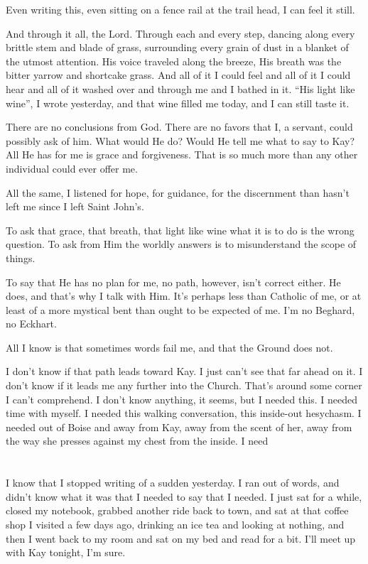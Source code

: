Even writing this, even sitting on a fence rail at the trail head, I can feel it still.

And through it all, the Lord. Through each and every step, dancing along every brittle stem and blade of grass, surrounding every grain of dust in a blanket of the utmost attention. His voice traveled along the breeze, His breath was the bitter yarrow and shortcake grass. And all of it I could feel and all of it I could hear and all of it washed over and through me and I bathed in it. ``His light like wine'', I wrote yesterday, and that wine filled me today, and I can still taste it.

There are no conclusions from God. There are no favors that I, a servant, could possibly ask of him. What would He do? Would He tell me what to say to Kay? All He has for me is grace and forgiveness. That is so much more than any other individual could ever offer me.

All the same, I listened for hope, for guidance, for the discernment than hasn't left me since I left Saint John's.

To ask that grace, that breath, that light like wine what it is to do is the wrong question. To ask from Him the worldly answers is to misunderstand the scope of things.

To say that He has no plan for me, no path, however, isn't correct either. He does, and that's why I talk with Him. It's perhaps less than Catholic of me, or at least of a more mystical bent than ought to be expected of me. I'm no Beghard, no Eckhart.

All I know is that sometimes words fail me, and that the Ground does not.

I don't know if that path leads toward Kay. I just can't see that far ahead on it. I don't know if it leads me any further into the Church. That's around some corner I can't comprehend. I don't know anything, it seems, but I needed this. I needed time with myself. I needed this walking conversation, this inside-out hesychasm. I needed out of Boise and away from Kay, away from the scent of her, away from the way she presses against my chest from the inside. I need

\section{}

I know that I stopped writing of a sudden yesterday. I ran out of words, and didn't know what it was that I needed to say that I needed. I just sat for a while, closed my notebook, grabbed another ride back to town, and sat at that coffee shop I visited a few days ago, drinking an ice tea and looking at nothing, and then I went back to my room and sat on my bed and read for a bit. I'll meet up with Kay tonight, I'm sure.

